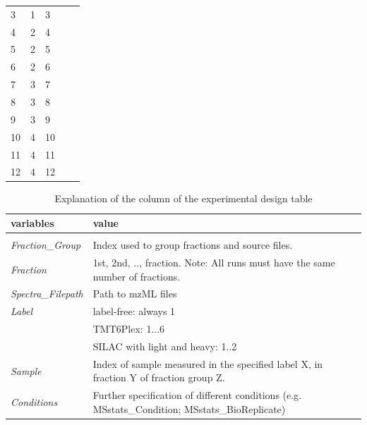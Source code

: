 \begin{table}[!ht]
\begin{tabular}{lllll}
3               & 1                  & 3                     &       &        \\
4               & 2                  & 4                     &       &        \\
5               & 2                  & 5                     &       &        \\
6               & 2                  & 6                     &       &        \\
7               & 3                  & 7                     &       &        \\
8               & 3                  & 8                     &       &        \\
9               & 3                  & 9                     &       &        \\
10              & 4                  & 10                    &       &        \\
11              & 4                  & 11                    &       &        \\
12              & 4                  & 12                    &       &       
\end{tabular}
\end{table}

\begin{table}[!ht]
\centering
\small
\caption{Explanation of the column of the experimental design table}
\label{t:Experimental_design_exp}
\begin{tabularx}{\textwidth}{l|X}
\textbf{variables} & \textbf{value} \\ 
\hline \\
\textit{Fraction\_Group} &  Index used to group fractions and source files.  \\
\textit{Fraction} & 1st, 2nd, .., fraction. Note: All runs must have the same number of fractions. \\
\textit{Spectra\_Filepath} & Path to mzML files \\
\textit{Label} & label-free: always 1 \\
\textit{} & TMT6Plex: 1...6 \\
\textit{} & SILAC with light and heavy: 1..2 \\
\textit{Sample} & Index of sample measured in the specified label X, in fraction Y of fraction group Z. \\
\textit{Conditions} & Further specification of different conditions (e.g. MSstats\_Condition; MSstats\_BioReplicate) \\
\end{tabularx}
\end{table}

